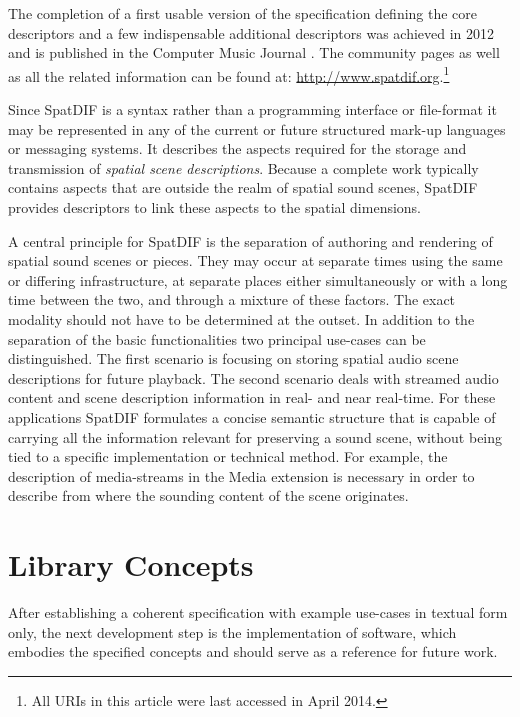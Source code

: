 \documentclass{article}
\begin{document}
The completion of a first usable version of the specification \cite{SpatDIF_03} defining the core descriptors and a few indispensable additional descriptors was achieved in 2012 and is published in the Computer Music Journal \cite{Peters:2013SpatDifCMJ}.
The community pages as well as all the related information can be found at: \url{http://www.spatdif.org}.\footnote{All URIs in this article were last accessed in April 2014.}

Since SpatDIF is a syntax rather than a programming interface or file-format it may be represented in any of the current or future structured mark-up languages or messaging systems.
It describes the aspects required for the storage and transmission of \emph{spatial scene descriptions}.
Because a complete work typically contains aspects that are outside the realm of spatial sound scenes, SpatDIF provides descriptors to link these aspects to the spatial dimensions.

A central principle for SpatDIF is the separation of authoring and rendering of spatial sound scenes or pieces.
They may occur at separate times using the same or differing infrastructure, at separate places either simultaneously or with a long time between the two, and through a mixture of these factors. 
The exact modality should not have to be determined at the outset.
In addition to the separation of the basic functionalities two principal use-cases can be distinguished.
The first scenario is focusing on storing spatial audio scene descriptions for future playback. 
The second scenario deals with streamed audio content and scene description information in real- and near real-time.
For these applications SpatDIF formulates a concise semantic structure that is capable of carrying all the information relevant for preserving a sound scene, without being tied to a specific implementation or technical method.
For example, the description of media-streams in the Media extension is necessary in order to describe from where the sounding content of the scene originates.

\section{Library Concepts}\label{sec:libspatdif_concepts}

After establishing a coherent specification with example use-cases in textual form only, the next development step is the implementation of software, which embodies the specified concepts and should serve as a reference for future work.
\end{document}
